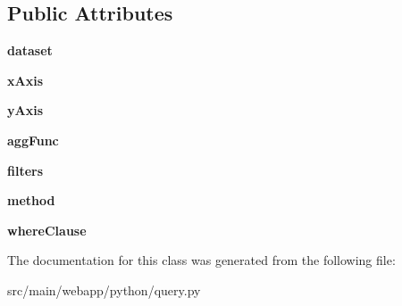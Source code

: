 \subsection*{Public Attributes}
\begin{DoxyCompactItemize}
\item 
\mbox{\label{classpython_1_1query_1_1_query_a6ee60773e9b5c2da720d7227007eacce}} 
{\bfseries dataset}
\item 
\mbox{\label{classpython_1_1query_1_1_query_a7316d0037bb7c7fea2e0346ba6ff322d}} 
{\bfseries x\+Axis}
\item 
\mbox{\label{classpython_1_1query_1_1_query_a5be9f74b43a1802a9281cdb9f407e6a0}} 
{\bfseries y\+Axis}
\item 
\mbox{\label{classpython_1_1query_1_1_query_a8bb3fc21391a6dfb3e9e46ba68545493}} 
{\bfseries agg\+Func}
\item 
\mbox{\label{classpython_1_1query_1_1_query_a19884a7a12eeb83ec2a8085d24add0fd}} 
{\bfseries filters}
\item 
\mbox{\label{classpython_1_1query_1_1_query_a0eb2f2858a1b293541a1c6fc16d449d7}} 
{\bfseries method}
\item 
\mbox{\label{classpython_1_1query_1_1_query_a7d6a4876d9ee2958dd4650b3804dfd0b}} 
{\bfseries where\+Clause}
\end{DoxyCompactItemize}


The documentation for this class was generated from the following file\+:\begin{DoxyCompactItemize}
\item 
src/main/webapp/python/query.\+py\end{DoxyCompactItemize}
